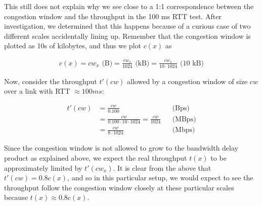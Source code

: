 This still does not explain why we see close to a 1:1 correspondence between the 
congestion window and the throughput in the 100 ms RTT test. After
investigation, we determined that this happens because of a curious case of two
different scales accidentally lining up. Remember that the congestion window is
plotted as 10s of kilobytes, and thus we plot $c(x)$ as

\begin{align*}
  c(x) = cw_x \text{\ (B)}
       = \frac{cw_x}{1024} \text{\ (kB)}
       = \frac{cw_x}{10 \cdot 1024} \text{\ (10 kB)}
\end{align*}

Now, consider the throughput $t'(cw)$ allowed by a congestion window of size
$cw$ over a link with RTT $\approx 100ms$:

\begin{align*}
  t'(cw) &= \frac{cw}{0.100}                       &&\text{(Bps)} \\
         &= \frac{cw}{0.100 \cdot 10 \cdot 1024}
          = \frac{cw}{1024}                        &&\text{(MBps)} \\
         &= \frac{cw}{8 \cdot 1024}                &&\text{(Mbps)}
\end{align*}

Since the congestion window is not allowed to grow to the bandwidth delay
product as explained above, we expect the real throughput $t(x)$ to be
approximately limited by $t'(cw_x)$. It is clear from the above that $t'(cw) =
0.8 c(x)$, and so in this particular setup, we would expect to see the
throughput follow the congestion window closely at these particular scales
because $t(x) \approx 0.8 c(x)$.
